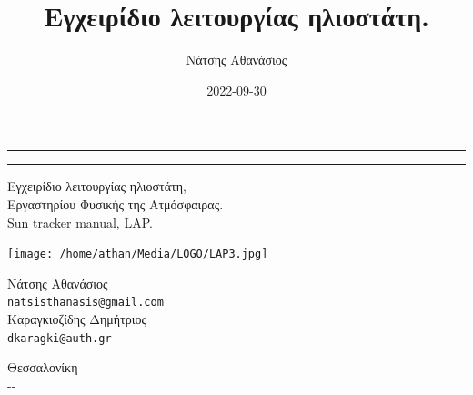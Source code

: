 \documentclass[
  a4paper,
  twoside,
  titlepage,
  12pt]{article}
\title{Εγχειρίδιο λειτουργίας ηλιοστάτη.}
\author{Νάτσης Αθανάσιος}
\date{2022-09-30}
\numberwithin{equation}{section}
\numberwithin{figure}{section}
\numberwithin{table}{section}
\begin{document}
\begin{titlepage}
    \clearpage\thispagestyle{empty}
    \newlength{\drop} %
    \textheight %

    \rule{\textwidth}{1pt}\par %
    \vspace{2pt}\vspace{-\baselineskip} %
    \rule{\textwidth}{0.4pt}\par %

    \vspace{0.6\drop} %
    \centering %
        {\Huge  Εγχειρίδιο λειτουργίας ηλιοστάτη,}\\[0.5\baselineskip] %
        {\Large Εργαστηρίου Φυσικής της Ατμόσφαιρας.}\\[0.75\baselineskip] %
        {\Huge  Sun tracker manual, LAP.} %

    \vfill

\texttt{[image: /home/athan/Media/LOGO/LAP3.jpg]}

    \vfill

    {\Large Νάτσης Αθανάσιος} \\
    {\small\texttt{natsisthanasis@gmail.com}}\\
    \vspace{10pt}
    {\Large Καραγκιοζίδης Δημήτριος}\\
    {\small\texttt{dkaragki@auth.gr}}\\

    \vfill %


    {Θεσσαλονίκη}\\
    {\large \textsc{\the\year-\the\month-\the\day}}\par %


\end{titlepage}
\end{document}
